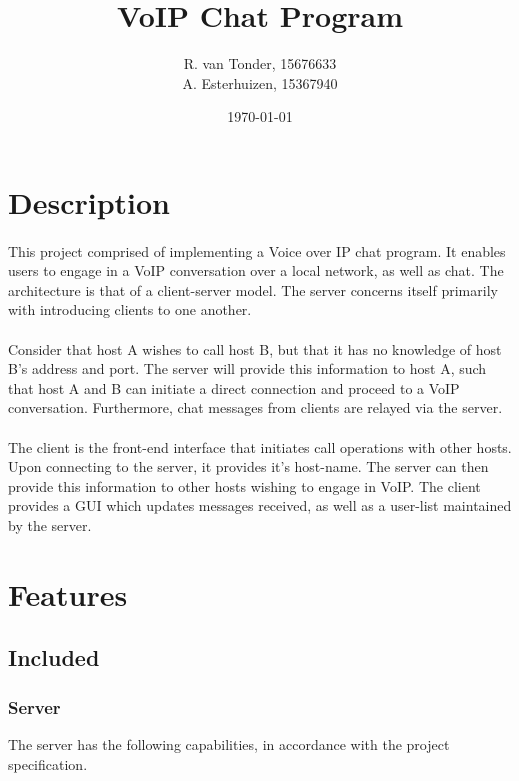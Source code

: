 \documentclass[10pt,a4paper]{article}
\title{VoIP Chat Program}
\author{R. van Tonder, 15676633 \\ A. Esterhuizen, 15367940}
\date{\today}
\begin{document}
\maketitle
\newpage
\tableofcontents
\newpage

\section{Description}
\paragraph{} This project comprised of implementing a Voice over IP chat program. It enables
users to engage in a VoIP conversation over a local network, as well as chat. The architecture
is that of a client-server model. The server concerns itself primarily with introducing clients to one another.

\paragraph{} Consider that host A wishes to call host B, but that it has no knowledge of host B's address and port.
The server will provide this information to host A, such that host A and B can initiate a direct connection
and proceed to a VoIP conversation. Furthermore, chat messages from clients are relayed via the server.

\paragraph{} The client is the front-end interface that initiates call operations with other hosts. Upon connecting to
the server, it provides it's host-name. The server can then provide this information to other hosts wishing
to engage in VoIP. The client provides a GUI which updates messages received, as well as a user-list maintained
by the server.

\section{Features}
\subsection{Included}
\subsubsection{Server}
The server has the following capabilities, in accordance with the
project specification.
\end{document}
